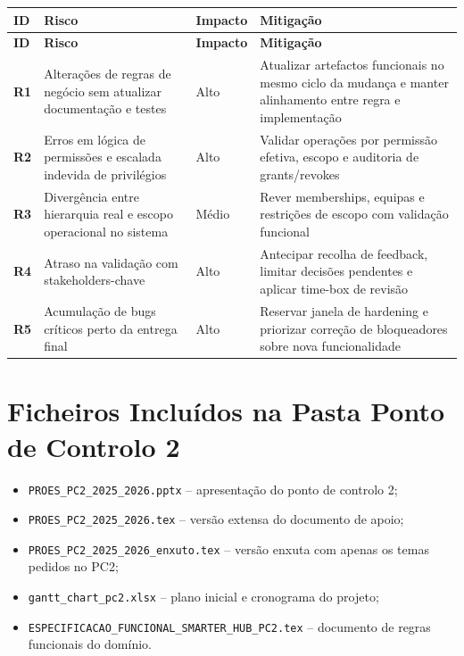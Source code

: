 \documentclass[11pt,a4paper,twoside]{article}
\newcommand{\tH}[1]{\textbf{\sffamily\small\color{white}#1}}
\newcommand{\theadrow}{\rowcolor{ACCENT}}
\begin{document}
\begin{longtable}{>{\small\bfseries}p{0.8cm} >{\small}p{5.0cm} >{\small\centering\arraybackslash}p{1.8cm} >{\small}p{5.1cm}}
\theadrow
\tH{ID} & \tH{Risco} & \tH{Impacto} & \tH{Mitigação} \\
\midrule
\endfirsthead
\theadrow
\tH{ID} & \tH{Risco} & \tH{Impacto} & \tH{Mitigação} \\
\midrule
\endhead
R1 & Alterações de regras de negócio sem atualizar documentação e testes & Alto & Atualizar artefactos funcionais no mesmo ciclo da mudança e manter alinhamento entre regra e implementação \\
R2 & Erros em lógica de permissões e escalada indevida de privilégios & Alto & Validar operações por permissão efetiva, escopo e auditoria de grants/revokes \\
R3 & Divergência entre hierarquia real e escopo operacional no sistema & Médio & Rever memberships, equipas e restrições de escopo com validação funcional \\
R4 & Atraso na validação com stakeholders-chave & Alto & Antecipar recolha de feedback, limitar decisões pendentes e aplicar time-box de revisão \\
R5 & Acumulação de bugs críticos perto da entrega final & Alto & Reservar janela de hardening e priorizar correção de bloqueadores sobre nova funcionalidade \\
\bottomrule
\end{longtable}

\section{Ficheiros Incluídos na Pasta Ponto de Controlo 2}

\begin{itemize}
  \item \texttt{PROES\_PC2\_2025\_2026.pptx} -- apresentação do ponto de controlo 2;
  \item \texttt{PROES\_PC2\_2025\_2026.tex} -- versão extensa do documento de apoio;
  \item \texttt{PROES\_PC2\_2025\_2026\_enxuto.tex} -- versão enxuta com apenas os temas pedidos no PC2;
  \item \texttt{gantt\_chart\_pc2.xlsx} -- plano inicial e cronograma do projeto;
  \item \texttt{ESPECIFICACAO\_FUNCIONAL\_SMARTER\_HUB\_PC2.tex} -- documento de regras funcionais do domínio.
\end{itemize}
\end{document}
